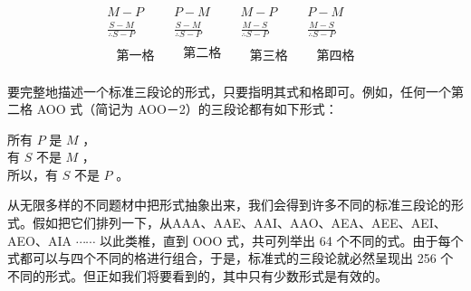 $$
\begin{array}{llll}
M-P & P-M & M-P & P-M \\
\frac{S-M}{\therefore S-P} & \frac{S-M}{\therefore S-P} & \frac{M-S}{\therefore S-P} & \frac{M-S}{\therefore S-P} \\
\begin{array}{l}
\text { 第一格 }
\end{array} & \begin{array}{l}
\text { 第二格 } \\
\end{array} & \begin{array}{l}
\text { 第三格 }
\end{array} & \begin{array}{l}
\text { 第四格 }
\end{array}
\end{array}
$$

要完整地描述一个标准三段论的形式，只要指明其式和格即可。例如，任何一个第二格 AOO 式（简记为 AOO－2）的三段论都有如下形式：

所有 $P$ 是 $M$ ，\\
有 $S$ 不是 $M$ ，\\
所以，有 $S$ 不是 $P$ 。

从无限多样的不同题材中把形式抽象出来，我们会得到许多不同的标准三段论的形式。假如把它们排列一下，从AAA、AAE、AAI、AAO、AEA、AEE、AEI、AEO、AIA $\cdots \cdots$ 以此类椎，直到 OOO 式，共可列举出 64 个不同的式。由于每个式都可以与四个不同的格进行组合，于是，标准式的三段论就必然呈现出 256 个不同的形式。但正如我们将要看到的，其中只有少数形式是有效的。

